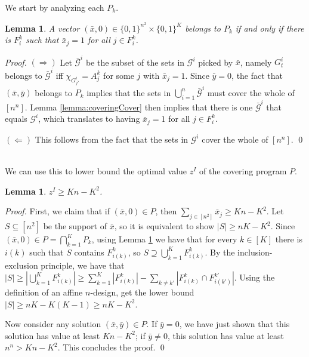 \documentclass[smallextended]{svjour3}
\newtheorem{lemma}[proposition]{Lemma}
\begin{document}
	We start by analyzing each $P_k$.
	
	\begin{lemma} \label{lemma:charPk}
		A vector $(\bar{x}, 0) \in \{0,1\}^{n^2} \times \{0,1\}^{K}$ belongs to $P_k$ if and only if there is $F_i^k$ such that $\bar{x}_j = 1$ for all $j\in F_i^k$.
	\end{lemma}
	
	\begin{proof}
		\noindent $(\Rightarrow)$ 
Let $\bar{\mathcal{G}}^i$ be the subset of the sets in ${\mathcal{G}}^i$ picked by
$\bar{x}$, namely $G^i_t$ belongs to $\bar{\mathcal{G}}^i$ iff
$\chi_{G^i_{j'}} = A^k_j$ for some $j$ with $\bar{x}_j = 1$. Since $\bar{y} = 0$, the fact that $(\bar{x}, \bar{y})$ belongs to $P_k$ implies that the sets in $\bigcup_{i = 1}^n \bar{\mathcal{G}}^i$ must cover
the whole of $[n^n]$. Lemma \ref{lemma:coveringCover} then
implies that there is one $\bar{\mathcal{G}}^i$ that equals ${\mathcal{G}}^i$, which
translates to having $\bar{x}_j = 1$ for all $j \in F^k_i$. 

		\smallskip \noindent $(\Leftarrow)$ This follows from the fact that the sets in ${\mathcal{G}}^i$ cover the whole of $[n^n]$.{
\ifmp
	\hfill \qed
\fi
}
	\end{proof}
	
	We can use this to lower bound the optimal value $z^I$ of the covering program $P$.

	\begin{lemma} \label{lemma:LBcovIP}
			$z^I \ge Kn - K^2$.
	\end{lemma}
	
	\begin{proof}
		First, we claim that if $(\bar{x}, 0) \in P$, then $\sum_{j \in [n^2]} \bar{x}_j \ge K n - K^2$. Let $S \subseteq [n^2]$ be the support of $\bar{x}$, so it is equivalent to show $|S| \ge n K - K^2$. Since $(\bar{x}, 0) \in P = \bigcap_{k=1}^K P_k$, using Lemma \ref{lemma:charPk} we have that for every
$k \in [K]$ there is $i(k)$ such that $S$ contains $F^k_{i(k)}$, so
$S \supseteq \bigcup_{k=1}^K F^k_{i(k)}$. By the inclusion-exclusion
principle, we have that $|S| \ge \left|\bigcup_{k=1}^K
F^k_{i(k)}\right| \ge \sum_{k =1}^K |F^k_{i(k)}| - \sum_{k\neq k'}
|F^k_{i(k)} \cap F^{k'}_{i(k')}|$. Using the definition of an
affine $n$-design, get the lower bound $|S| \ge nK - K(K - 1) \geq nK - K^2$.

	Now consider any solution $(\bar{x}, \bar{y}) \in P$. If $\bar{y} = 0$, we have just shown that this solution has value at least $Kn - K^2$; if $\bar{y} \neq 0$, this solution has value at least $n^n > Kn - K^2$. This concludes the proof. {
\ifmp
	\hfill \qed
\fi
}
	\end{proof}
\end{document}
